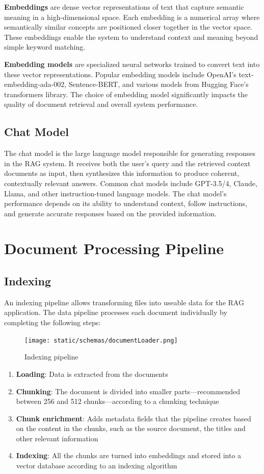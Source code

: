 \documentclass[11pt,a4paper]{report}
\begin{document}
\textbf{Embeddings} are dense vector representations of text that capture semantic meaning in a high-dimensional space. Each embedding is a numerical array where semantically similar concepts are positioned closer together in the vector space. These embeddings enable the system to understand context and meaning beyond simple keyword matching.

\textbf{Embedding models} are specialized neural networks trained to convert text into these vector representations. Popular embedding models include OpenAI's text-embedding-ada-002, Sentence-BERT, and various models from Hugging Face's transformers library. The choice of embedding model significantly impacts the quality of document retrieval and overall system performance.

\subsection{Chat Model}
The chat model is the large language model responsible for generating responses in the RAG system. It receives both the user's query and the retrieved context documents as input, then synthesizes this information to produce coherent, contextually relevant answers. Common chat models include GPT-3.5/4, Claude, Llama, and other instruction-tuned language models. The chat model's performance depends on its ability to understand context, follow instructions, and generate accurate responses based on the provided information.

\section{Document Processing Pipeline}

\subsection{Indexing}
An indexing pipeline allows transforming files into useable data for the RAG application. The data pipeline processes each document individually by completing the following steps:

\begin{figure}[H]
        \centering
        \texttt{[image: static/schemas/documentLoader.png]}
        \caption{Indexing pipeline}
        \label{fig:indexpipeline}
\end{figure}

\begin{enumerate}
    \item \textbf{Loading}: Data is extracted from the documents
    \item \textbf{Chunking}: The document is divided into smaller parts—recommended between 256 and 512 chunks—according to a chunking technique
    \item \textbf{Chunk enrichment}: Adds metadata fields that the pipeline creates based on the content in the chunks, such as the source document, the titles and other relevant information
    \item \textbf{Indexing}: All the chunks are turned into embeddings and stored into a vector database according to an indexing algorithm\cite{berge2025hybrid}
\end{enumerate}
\end{document}

